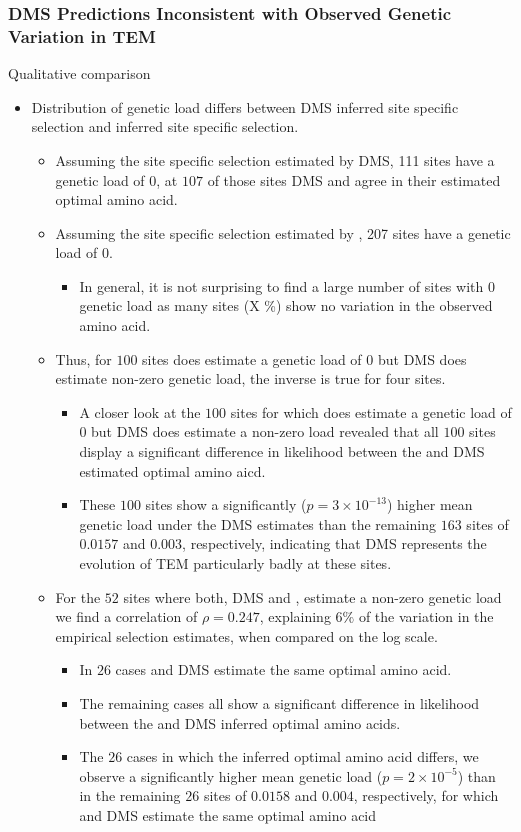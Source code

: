 \documentclass[12pt]{article}
\begin{document}
\subsubsection*{DMS Predictions Inconsistent with Observed Genetic Variation in TEM}
Qualitative comparison
\begin{itemize}
	\item Distribution of genetic load differs between DMS inferred site specific selection and \selac inferred site specific selection.
	\begin{itemize}
		\item Assuming the site specific selection estimated by DMS, 111 sites have a genetic load of 0, at $107$ of those sites DMS and \selac agree in their estimated optimal amino acid.
		\item Assuming the site specific selection estimated by \selac, 207 sites have a genetic load of 0.
		\begin{itemize}
			\item In general, it is not surprising to find a large number of sites with 0 genetic load as many sites (X \%) show no variation in the observed amino acid.
		\end{itemize}
		\item Thus, for $100$ sites \selac does estimate a genetic load of 0 but DMS does estimate non-zero genetic load, the inverse is true for four sites.
		\begin{itemize}
			\item A closer look at the $100$ sites for which \selac does estimate a genetic load of $0$ but DMS does estimate a non-zero load revealed that all $100$ sites display a significant difference in likelihood between the \selac and DMS estimated optimal amino aicd.
			\item These $100$ sites show a significantly ($p = 3\times10^{-13}$) higher mean genetic load under the DMS estimates than the remaining $163$ sites of $0.0157$ and $0.003$, respectively, indicating that DMS represents the evolution of TEM particularly badly at these sites.
		\end{itemize}
		\item For the $52$ sites where both, DMS and \selac, estimate a non-zero genetic load we find a correlation of $\rho = 0.247$, explaining $6 \%$ of the variation in the empirical selection estimates, when compared on the log scale.
		\begin{itemize}
			\item In $26$ cases \selac and DMS estimate the same optimal amino acid.
			\item The remaining cases all show a significant difference in likelihood between the \selac and DMS inferred optimal amino acids.
			\item The $26$ cases in which the inferred optimal amino acid differs, we observe a significantly higher mean genetic load ($p = 2\times10^{-5}$) than in the remaining $26$ sites of $0.0158$ and $0.004$, respectively, for which \selac and DMS estimate the same optimal amino acid
		\end{itemize}
	\end{itemize}
\end{itemize}
\end{document}
